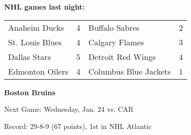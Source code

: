 \textbf{NHL games last night:
}\begin{tabular}{llll}
\toprule
  Anaheim Ducks & 4 &        Buffalo Sabres & 2 \\
St. Louis Blues & 4 &        Calgary Flames & 3 \\
   Dallas Stars & 5 &     Detroit Red Wings & 4 \\
Edmonton Oilers & 4 & Columbus Blue Jackets & 1 \\
\bottomrule
\end{tabular}

\textbf{Boston Bruins}

Next Game: Wednesday, Jan. 24 vs. CAR

Record: 29-8-9 (67 points), 1st in NHL Atlantic 
